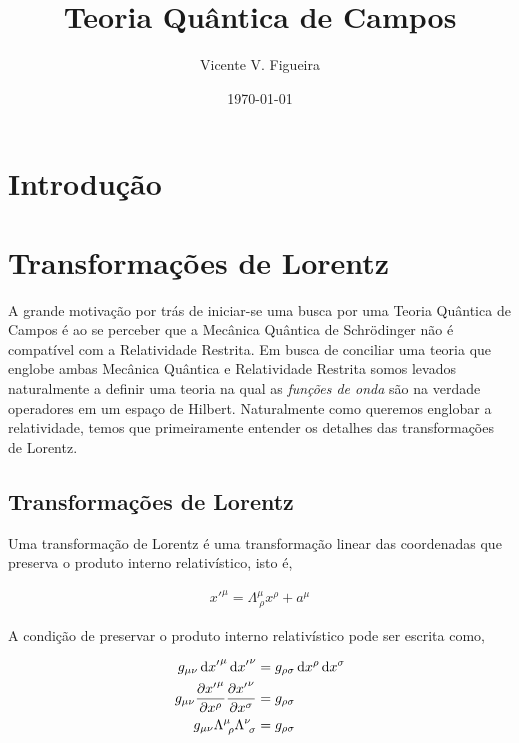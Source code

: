 \documentclass[twoside]{amsart}
\title{
Teoria Quântica de Campos
}
\author{
  Vicente V. Figueira
       }
\date{\today}
\numberwithin{equation}{section}
\begin{document}
\maketitle

\tableofcontents



\section{Introdução}

\newpage

\section{Transformações de Lorentz}

A grande motivação por trás de iniciar-se uma busca por uma Teoria Quântica de Campos é ao se perceber que 
a Mecânica Quântica de Schrödinger não é compatível com a Relatividade Restrita. Em busca de conciliar uma 
teoria que englobe ambas Mecânica Quântica e Relatividade Restrita somos levados naturalmente a definir 
uma teoria na qual as \emph{funções de onda} são na verdade operadores em um espaço de Hilbert. Naturalmente 
como queremos englobar a relatividade, temos que primeiramente entender os detalhes das transformações de Lorentz.

\subsection{Transformações de Lorentz}

Uma transformação de Lorentz é uma transformação linear das coordenadas que preserva o produto interno relativístico, 
isto é, 

\begin{align*}
    {x'}^{\mu}=\Lambda^{\mu}_{\ \rho}x^\rho+a^\mu
\end{align*}

A condição de preservar o produto interno relativístico pode ser escrita como,

\begin{align*}
    g_{\mu\nu}\dd{{x'}^{\mu}}\dd{{x'}^{\nu}}&=g_{\rho\sigma}\dd{x^{\rho}}\dd{x^\sigma}\\
    g_{\mu\nu}\pdv{{x'}^\mu}{x^\rho}\pdv{{x'}^\nu}{x^\sigma}&=g_{\rho\sigma}\\
    g_{\mu\nu}\Lambda^{\mu}_{\ \rho}\Lambda^{\nu}_{\ \sigma}&=g_{\rho\sigma}
\end{align*}
\end{document}
